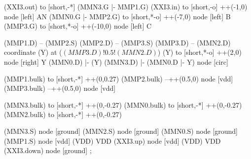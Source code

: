 \begin{circuitikz}[american]
	(XXI3.out) to [short,-*] (MMN3.G |- MMP1.G)
	(XXI3.in) to [short,-o] ++(-1,0) node [left] {AN}
	(MMN0.G |- MMP2.G) to [short,*-o] ++(-7,0) node [left] {B}
	(MMP3.G) to [short,*-o] ++(-10,0) node [left] {C}
	
	(MMP1.D) -- (MMP2.S)
	(MMP2.D) -- (MMP3.S)
	(MMP3.D) -- (MMN2.D)
	coordinate (Y) at ($(MMP3.D)!0.5!(MMN2.D)$)
	(Y) to [short,*-o] ++(2,0) node [right] {Y}
	(MMN0.D) |- (Y)
	(MMN3.D) |- (MMN0.D |- Y) node [circ] {}
	
	(MMP1.bulk) to [short,-*] ++(0,0.27)
	(MMP2.bulk) --++(0.5,0) node [vdd] {}
	(MMP3.bulk) --++(0.5,0) node [vdd] {}
	
	(MMN3.bulk) to [short,-*] ++(0,-0.27)
	(MMN0.bulk) to [short,-*] ++(0,-0.27)
	(MMN2.bulk) to [short,-*] ++(0,-0.27)


	(MMN3.S) node [ground] {}
	(MMN2.S) node [ground] {}
	(MMN0.S) node [ground] {}
	(MMP1.S) node [vdd] (VDD) {VDD}
	(XXI3.up) node [vdd] (VDD) {VDD}
	(XXI3.down) node [ground] {}
;

\end{circuitikz}

